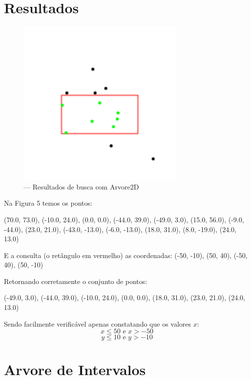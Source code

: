 \section{Resultados}
\begin{figure}[htb]
    \caption{\label{fig:Fig_5} — Resultados de busca com Arvore2D}
    \begin{center}
        \includegraphics{images/points.pdf}
    \end{center}
\end{figure}


Na Figura 5 temos os pontos:

(70.0, 73.0), (-10.0, 24.0), (0.0, 0.0), (-44.0, 39.0), (-49.0, 3.0), (15.0, 56.0), 
(-9.0, -44.0), (23.0, 21.0), (-43.0, -13.0), (-6.0, -13.0), (18.0, 31.0), (8.0, -19.0),
 (24.0, 13.0)

E a consulta (o retângulo em vermelho) as coordenadas: (-50, -10), (50, 40), (-50, 40), (50, -10)

Retornando corretamente o conjunto de pontos:

(-49.0, 3.0),
(-44.0, 39.0),
(-10.0, 24.0),
(0.0, 0.0),
(18.0, 31.0),
(23.0, 21.0),
(24.0, 13.0)

Sendo facilmente verificável apenas constatando que os valores $x$:
\[ x \leq 50 \textrm{ e } x > -50 \]
\[ y \leq 10 \textrm{ e } y > -10 \]

\section{Arvore de Intervalos}


